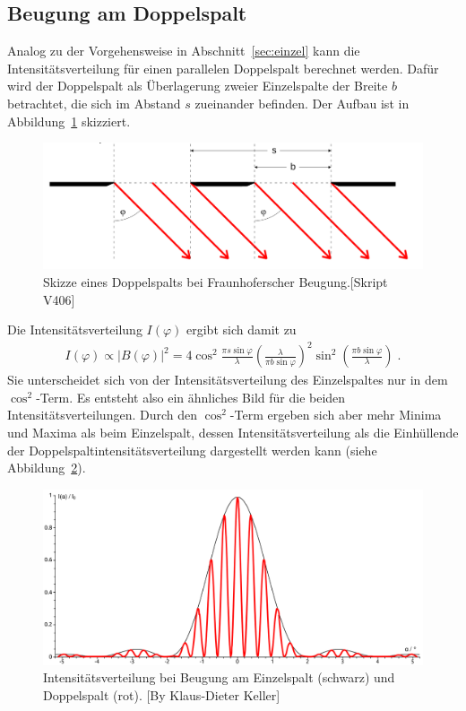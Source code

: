 \subsection{Beugung am Doppelspalt}
Analog zu der Vorgehensweise in Abschnitt~\ref{sec:einzel} kann die Intensitätsverteilung für einen parallelen Doppelspalt berechnet werden. Dafür wird der Doppelspalt als Überlagerung zweier Einzelspalte der Breite $b$ betrachtet, die sich im Abstand $s$ zueinander befinden. Der Aufbau ist in Abbildung~\ref{fig:doppel} skizziert.

\begin{figure}
  \centering
  \includegraphics[width=0.4\textheight]{../figures/doppel.png}
  \caption{Skizze eines Doppelspalts bei Fraunhoferscher Beugung.[Skript V406]}
\label{fig:doppel}
\end{figure}

Die Intensitätsverteilung $I(\varphi)$ ergibt sich damit zu
\begin{align}
  I(\varphi) \propto |B(\varphi)|^2 = 4 \cos^2{\frac{\pi s \sin{\varphi}}{\lambda}}(\frac{\lambda}{\pi b \sin{\varphi}})^2 \sin^2{(\frac{\pi b \sin{\varphi}}{\lambda})} \; .
  \label{equ:I_doppel}
\end{align}
Sie unterscheidet sich von der Intensitätsverteilung des Einzelspaltes nur in dem $\cos^2$-Term. Es entsteht also ein ähnliches Bild für die beiden Intensitätsverteilungen. Durch den $\cos^2$-Term ergeben sich aber mehr Minima und Maxima als beim Einzelspalt, dessen Intensitätsverteilung als die Einhüllende der Doppelspaltintensitätsverteilung dargestellt werden kann (siehe Abbildung~\ref{fig:slit}).

\begin{figure}
  \centering
  \includegraphics[width=0.4\textheight]{../figures/Slit_double.png}
  \caption{Intensitätsverteilung bei Beugung am Einzelspalt (schwarz) und Doppelspalt (rot). [By Klaus-Dieter Keller]}
\label{fig:slit}
\end{figure}


